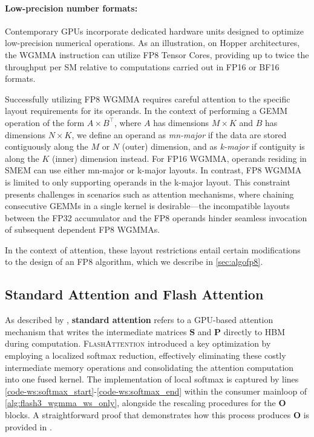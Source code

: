 \paragraph{Low-precision number formats:}
\label{sec:low-precision-gpu}
Contemporary GPUs incorporate dedicated hardware units designed to optimize low-precision numerical operations. As an illustration, on Hopper architectures, the WGMMA instruction can utilize FP8 Tensor Cores, providing up to twice the throughput per SM relative to computations carried out in FP16 or BF16 formats.

Successfully utilizing FP8 WGMMA requires careful attention to the specific layout requirements for its operands. In the context of performing a GEMM operation of the form $A \times B^{\top}$, where $A$ has dimensions $M \times K$ and $B$ has dimensions $N \times K$, we define an operand as \emph{mn-major} if the data are stored contiguously along the $M$ or $N$ (outer) dimension, and as \emph{k-major} if contiguity is along the $K$ (inner) dimension instead. For FP16 WGMMA, operands residing in SMEM can use either mn-major or k-major layouts. In contrast, FP8 WGMMA is limited to only supporting operands in the k-major layout. This constraint presents challenges in scenarios such as attention mechanisms, where chaining consecutive GEMMs in a single kernel is desirable—the incompatible layouts between the FP32 accumulator and the FP8 operands hinder seamless invocation of subsequent dependent FP8 WGMMAs.

In the context of attention, these layout restrictions entail certain modifications to the design of an FP8 algorithm, which we describe in \cref{sec:algofp8}.

\subsection{Standard Attention and Flash Attention} As described by \citet{dao2022flashattention}, \textbf{standard attention} refers to a GPU-based attention mechanism that writes the intermediate matrices $\mathbf{S}$ and $\mathbf{P}$ directly to HBM during computation. \textsc{FlashAttention} introduced a key optimization by employing a localized softmax reduction, effectively eliminating these costly intermediate memory operations and consolidating the attention computation into one fused kernel. The implementation of local softmax is captured by lines \ref{code-ws:softmax_start}-\ref{code-ws:softmax_end} within the consumer mainloop of \cref{alg:flash3_wgmma_ws_only}, alongside the rescaling procedures for the $\mathbf{O}$ blocks. A straightforward proof that demonstrates how this process produces $\mathbf{O}$ is provided in \cite[\S 2.3.1]{dao2023flashattention2}.

